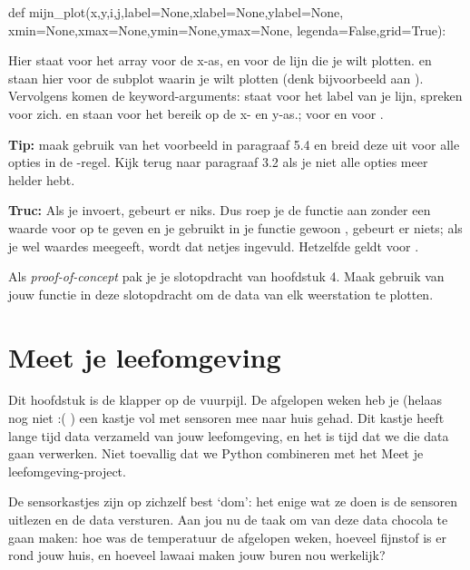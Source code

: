 \documentclass[a4paper,11pt, fleqn]{article}
\newcommand{\ditwc}{Naam van het huidige werkcollege}
\begin{document}
\begin{python}
def mijn_plot(x,y,i,j,label=None,xlabel=None,ylabel=None,
	      xmin=None,xmax=None,ymin=None,ymax=None,
	      legenda=False,grid=True):
\end{python}
Hier staat  voor het array voor de x-as, en  voor de lijn die je wilt plotten.  en  staan hier voor de subplot waarin je wilt plotten (denk bijvoorbeeld aan ). Vervolgens komen de keyword-arguments:  staat voor het label van je lijn,  spreken voor zich.  en  staan voor het bereik op de x- en y-as.;  voor  en  voor .

\bigbreak
{\bf Tip:} maak gebruik van het voorbeeld in paragraaf 5.4 en breid deze uit voor alle opties in de -regel. Kijk terug naar paragraaf 3.2 als je niet alle opties meer helder hebt.

\bigbreak
{\bf Truc:} Als je  invoert, gebeurt er niks. Dus roep je de functie aan zonder een waarde voor  op te geven en je gebruikt in je functie gewoon , gebeurt er niets; als je wel waardes meegeeft, wordt dat netjes ingevuld. Hetzelfde geldt voor .

\bigbreak
Als {\it proof-of-concept} pak je je slotopdracht van hoofdstuk 4. Maak gebruik van jouw functie in deze slotopdracht om de data van elk weerstation te plotten.


\clearpage
\renewcommand{\ditwc}{Meet je leefomgeving}
\section[Meet je leefomgeving]{\ditwc}
Dit hoofdstuk is de klapper op de vuurpijl. De afgelopen weken heb je (helaas nog niet :( ) een kastje vol met sensoren mee naar huis gehad. Dit kastje heeft lange tijd data verzameld van jouw leefomgeving, en het is tijd dat we die data gaan verwerken. Niet toevallig dat we Python combineren met het Meet je leefomgeving-project. 

De sensorkastjes zijn op zichzelf best `dom': het enige wat ze doen is de sensoren uitlezen en de data versturen. Aan jou nu de taak om van deze data chocola te gaan maken: hoe was de temperatuur de afgelopen weken, hoeveel fijnstof is er rond jouw huis, en hoeveel lawaai maken jouw buren nou werkelijk?
\end{document}
